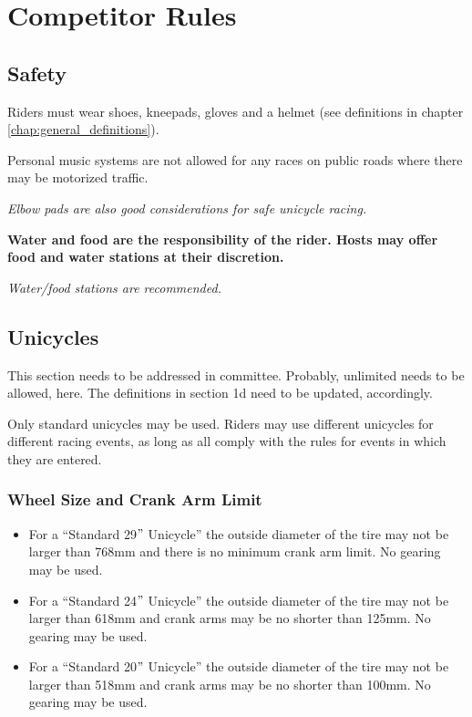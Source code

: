 
\chapter{Competitor Rules}

\section{Safety}
Riders must wear shoes, kneepads, gloves and a helmet (see definitions in chapter \ref{chap:general_definitions}).

Personal music systems are not allowed for any races on public roads where there may be motorized traffic.

\textit{Elbow pads are also good considerations for safe unicycle racing.}

\textbf{Water and food are the responsibility of the rider. Hosts may offer food and water stations at their discretion.}

\textit{Water/food stations are recommended.}

\section{Unicycles}

\begin{framed}
This section needs to be addressed in committee.  Probably, unlimited needs to be allowed, here.  The definitions in section 1d need to be updated, accordingly.

\end{framed}

Only standard unicycles may be used.
Riders may use different unicycles for different racing events, as long as all comply with the rules for events in which they are entered.

\subsection{Wheel Size and Crank Arm Limit}

\begin{itemize}
\item For a ``Standard 29$"$ Unicycle'' the outside diameter of the tire may not be larger than 768mm and there is no minimum crank arm limit.
No gearing may be used.
\item For a ``Standard 24$"$ Unicycle'' the outside diameter of the tire may not be larger than 618mm and crank arms may be no shorter than 125mm.
No gearing may be used.
\item For a ``Standard 20$"$ Unicycle'' the outside diameter of the tire may not be larger than 518mm and crank arms may be no shorter than 100mm.
No gearing may be used.
\end{itemize}

